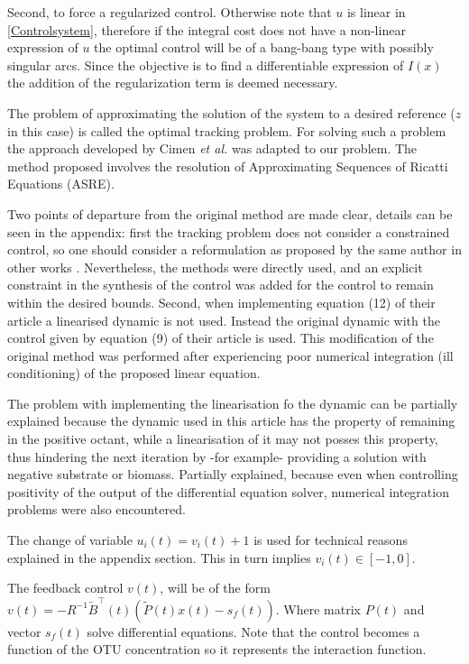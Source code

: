 \documentclass[3p,times]{elsarticle}
\begin{document}
Second, to force a regularized control. Otherwise note that $u$ is linear in \eqref{Controlsystem}, therefore if the integral cost does not have a non-linear expression of $u$ the optimal control will be of a bang-bang type with possibly singular arcs. Since the objective is to find a differentiable expression of $I(x)$ the addition of the regularization term is deemed necessary.

The problem of approximating the solution of the system to a desired reference ($z$ in this case) is called the optimal tracking problem. For solving such a problem the approach developed by Cimen \textit{et al.} \cite{Cimen2004} was adapted to our problem. The method proposed involves the resolution of Approximating Sequences of Ricatti Equations (ASRE). 

Two points of departure from the original method are made clear, details can be seen in the appendix: first the tracking problem does not consider a constrained control, so one should consider a reformulation as proposed by the same author in other works \cite{Cimen2008}. Nevertheless, the methods were directly used, and an explicit constraint in the synthesis of the control was added for the control to remain within the desired bounds. Second, when implementing equation (12) of their article \cite{Cimen2008} a linearised dynamic is not used. Instead the original dynamic with the control given by equation (9) of their article is used. This modification of the original method was performed after experiencing poor numerical integration (ill conditioning) of the proposed linear equation. 

The problem with implementing the linearisation fo the dynamic can be partially explained because the dynamic used in this article has the property of remaining in the positive octant, while a linearisation of it may not posses this property, thus hindering the next iteration by -for example- providing a solution with negative substrate or biomass. Partially explained, because even when controlling positivity of the output of the differential equation solver, numerical integration problems were also encountered.

The change of variable $u_i(t) = v_i(t) + 1$ is used for technical reasons explained in the appendix section. This in turn implies $v_i(t) \in [-1,0]$.

The feedback control $v(t)$, will be of the form $v(t) = -R^{-1}\tilde{B}^\top(t)\left(\tilde{P}(t)x(t)-s_f(t)\right)$. Where matrix $P(t)$ and vector $s_f(t)$ solve differential equations. Note that the control becomes a function of the OTU concentration so it represents the interaction function.
\end{document}
